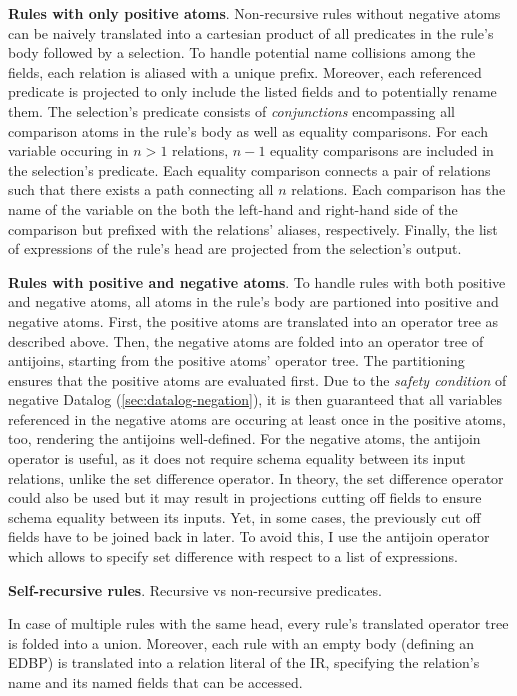 \textbf{Rules with only positive atoms}.
Non-recursive rules without negative atoms can be naively translated
into a cartesian product of all predicates in the rule's body followed by
a selection.
To handle potential name collisions among the fields,
each relation is aliased with a unique prefix.
Moreover, each referenced predicate is projected to only include the listed
fields and to potentially rename them.
The selection's predicate consists of \emph{conjunctions}
encompassing all comparison atoms in the rule's body as well as equality comparisons.
For each variable occuring in \(n > 1\) relations, \(n - 1\) equality comparisons
are included in the selection's predicate.
Each equality comparison connects a pair of relations such that there exists
a path connecting all \(n\) relations.
Each comparison has the name of the variable on the both the left-hand and right-hand
side of the comparison but prefixed with the relations' aliases, respectively.
Finally, the list of expressions of the rule's head are projected from the
selection's output.

\textbf{Rules with positive and negative atoms}.
To handle rules with both positive and negative atoms,
all atoms in the rule's body are partioned into positive and negative atoms.
First, the positive atoms are translated into an operator tree as described above.
Then, the negative atoms are folded into an operator tree of antijoins,
starting from the positive atoms' operator tree.
The partitioning ensures that the positive atoms are evaluated first.
Due to the \emph{safety condition} of negative Datalog (\ref{sec:datalog-negation}),
it is then guaranteed that all variables referenced in the negative atoms are
occuring at least once in the positive atoms, too, rendering the antijoins well-defined.
For the negative atoms, the antijoin operator is useful, as it does not
require schema equality between its input relations, unlike the set difference operator.
In theory, the set difference operator could also be used but it may result
in projections cutting off fields to ensure schema equality between its inputs.
Yet, in some cases, the previously cut off fields have to be joined back in later.
To avoid this, I use the antijoin operator which allows to specify set difference
with respect to a list of expressions.

\textbf{Self-recursive rules}.
Recursive vs non-recursive predicates.

In case of multiple rules with the same head,
every rule's translated operator tree is folded into a union.
Moreover, each rule with an empty body (defining an \ac{EDBP})
is translated into a relation literal of the \ac{IR}, specifying
the relation's name and its named fields that can be accessed.

